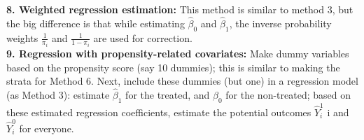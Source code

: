 \documentclass[a4paper,7pt,landscape]{extarticle}
\begin{document}
\begin{multicols}{3}
\begin{boxA}
\textbf{8. Weighted regression estimation:} This method is similar to method 3, but the big difference is that while estimating $\hat{\beta}_0$ and $\hat{\beta}_1$, the inverse probability weights $\frac{1}{\pi_i}$ and $\frac{1}{1-\pi_i}$ are used for correction.\\
\textbf{9. Regression with propensity-related covariates:} Make dummy variables based on the propensity score (say 10 dummies); this is similar to making the strata for Method 6. Next, include these dummies (but one) in a regression model (as Method 3): estimate $\hat{\beta}_1$ for the treated, and $\hat{\beta}_0$ for the non-treated; based on these estimated regression coefficients, estimate the potential outcomes $\hat{Y}_i^1$ i and $\hat{Y}_i^0$ for everyone.
    
\end{boxA}


\end{multicols}
\end{document}

